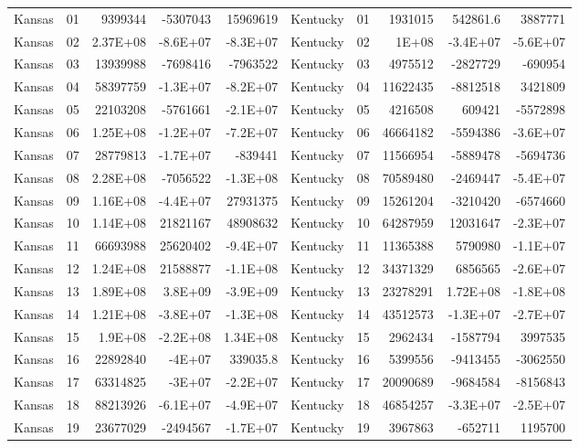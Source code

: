 \begin{landscape}
\begin{singlespace}
\begin{longtable}{lrrrr|lrrrr}
		Kansas &  01  & 9399344 & -5307043 & 15969619 & Kentucky &  01  & 1931015 & 542861.6 & 3887771 \\
		Kansas &  02  & 2.37E+08 & -8.6E+07 & -8.3E+07 & Kentucky &  02  & 1E+08 & -3.4E+07 & -5.6E+07 \\
		Kansas &  03  & 13939988 & -7698416 & -7963522 & Kentucky &  03  & 4975512 & -2827729 & -690954 \\
		Kansas &  04  & 58397759 & -1.3E+07 & -8.2E+07 & Kentucky &  04  & 11622435 & -8812518 & 3421809 \\
		Kansas &  05  & 22103208 & -5761661 & -2.1E+07 & Kentucky &  05  & 4216508 & 609421 & -5572898 \\
		Kansas &  06  & 1.25E+08 & -1.2E+07 & -7.2E+07 & Kentucky &  06  & 46664182 & -5594386 & -3.6E+07 \\
		Kansas &  07  & 28779813 & -1.7E+07 & -839441 & Kentucky &  07  & 11566954 & -5889478 & -5694736 \\
		Kansas &  08  & 2.28E+08 & -7056522 & -1.3E+08 & Kentucky &  08  & 70589480 & -2469447 & -5.4E+07 \\
		Kansas &  09  & 1.16E+08 & -4.4E+07 & 27931375 & Kentucky &  09  & 15261204 & -3210420 & -6574660 \\
		Kansas &  10 & 1.14E+08 & 21821167 & 48908632 & Kentucky &  10 & 64287959 & 12031647 & -2.3E+07 \\
		Kansas &  11 & 66693988 & 25620402 & -9.4E+07 & Kentucky &  11 & 11365388 & 5790980 & -1.1E+07 \\
		Kansas &  12 & 1.24E+08 & 21588877 & -1.1E+08 & Kentucky &  12 & 34371329 & 6856565 & -2.6E+07 \\
		Kansas &  13 & 1.89E+08 & 3.8E+09 & -3.9E+09 & Kentucky &  13 & 23278291 & 1.72E+08 & -1.8E+08 \\
		Kansas &  14 & 1.21E+08 & -3.8E+07 & -1.3E+08 & Kentucky &  14 & 43512573 & -1.3E+07 & -2.7E+07 \\
		Kansas &  15 & 1.9E+08 & -2.2E+08 & 1.34E+08 & Kentucky &  15 & 2962434 & -1587794 & 3997535 \\
		Kansas &  16 & 22892840 & -4E+07 & 339035.8 & Kentucky &  16 & 5399556 & -9413455 & -3062550 \\
		Kansas &  17 & 63314825 & -3E+07 & -2.2E+07 & Kentucky &  17 & 20090689 & -9684584 & -8156843 \\
		Kansas &  18 & 88213926 & -6.1E+07 & -4.9E+07 & Kentucky &  18 & 46854257 & -3.3E+07 & -2.5E+07 \\
		Kansas &  19 & 23677029 & -2494567 & -1.7E+07 & Kentucky &  19 & 3967863 & -652711 & 1195700 \\

\end{longtable}
\end{singlespace}
\end{landscape}
